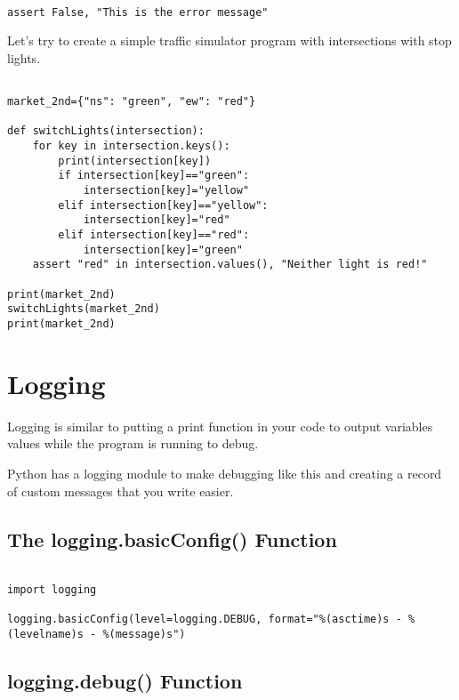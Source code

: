 \documentclass[11pt]{article}
\begin{document}
\begin{verbatim}

assert False, "This is the error message"

\end{verbatim}

Let's try to create a simple traffic simulator program with intersections with stop lights.

\begin{verbatim}

market_2nd={"ns": "green", "ew": "red"}

def switchLights(intersection):
    for key in intersection.keys():
        print(intersection[key])
        if intersection[key]=="green":
            intersection[key]="yellow"
        elif intersection[key]=="yellow":
            intersection[key]="red"
        elif intersection[key]=="red":
            intersection[key]="green"
    assert "red" in intersection.values(), "Neither light is red!"

print(market_2nd)
switchLights(market_2nd)
print(market_2nd)

\end{verbatim}

\section{Logging}
\label{sec:org9ecb1d4}

Logging is similar to putting a print function in your code to output variables values while the program is running to debug.

Python has a logging module to make debugging like this and creating a record of custom messages that you write easier.

\subsection{The logging.basicConfig() Function}
\label{sec:orge98a65c}

\begin{verbatim}

import logging

logging.basicConfig(level=logging.DEBUG, format="%(asctime)s - %(levelname)s - %(message)s")

\end{verbatim}

\subsection{logging.debug() Function}
\label{sec:org2a139fb}
\end{document}
